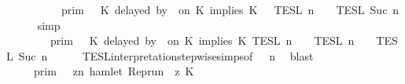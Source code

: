 \begin{isabellebody}
\ \ \ \ \ \ \ \ {\isasymlbrakk}{\isasymlbrakk}\ {\isasymGamma}\ {\isasymrbrakk}{\isasymrbrakk}\isactrlsub p\isactrlsub r\isactrlsub i\isactrlsub m\ {\isasyminter}\ {\isasymlbrakk}{\isasymlbrakk}\ {\isacharparenleft}K\ delayed\ by\ {}\ on\ K\ implies\ K\ {\isacharhash}\ {\isasymPsi}\ {\isasymrbrakk}{\isasymrbrakk}\isactrlsub T\isactrlsub E\isactrlsub S\isactrlsub L\isactrlbsup {\isasymge}\ n\isactrlesup \ {\isasyminter}\ {\isasymlbrakk}{\isasymlbrakk}\ {\isasymPhi}\ {\isasymrbrakk}{\isasymrbrakk}\isactrlsub T\isactrlsub E\isactrlsub S\isactrlsub L\isactrlbsup {\isasymge}\ Suc\ n\isactrlesup {\isacartoucheclose}\isanewline
\ \ \ \ \isamarkupfalse%
\ simp\isanewline
\ \ \isamarkupfalse%
\ \isamarkupfalse%
\ \isanewline
\ \ \ \ {\isacartoucheopen}{\isachardot}{\isachardot}{\isachardot}\ {\isacharequal}\ {\isasymlbrakk}{\isasymlbrakk}\ {\isasymGamma}\ {\isasymrbrakk}{\isasymrbrakk}\isactrlsub p\isactrlsub r\isactrlsub i\isactrlsub m\ {\isasyminter}\ {\isasymlbrakk}\ K\ delayed\ by\ {}\ on\ K\ implies\ K\ {\isasymrbrakk}\isactrlsub T\isactrlsub E\isactrlsub S\isactrlsub L\isactrlbsup {\isasymge}\ n\isactrlesup \ {\isasyminter}\ {\isasymlbrakk}{\isasymlbrakk}\ {\isasymPsi}\ {\isasymrbrakk}{\isasymrbrakk}\isactrlsub T\isactrlsub E\isactrlsub S\isactrlsub L\isactrlbsup {\isasymge}\ n\isactrlesup \ {\isasyminter}\ {\isasymlbrakk}{\isasymlbrakk}\ {\isasymPhi}\ {\isasymrbrakk}{\isasymrbrakk}\isactrlsub T\isactrlsub E\isactrlsub S\isactrlsub L\isactrlbsup {\isasymge}\ Suc\ n\isactrlesup {\isacartoucheclose}\isanewline
\ \ \ \ \isamarkupfalse%
\ TESL{\isacharunderscore}interpretation{\isacharunderscore}stepwise{\isachardot}simps{\isacharparenleft}{}{\isacharparenright}{\isacharbrackleft}of\ {\isacharunderscore}\ {\isacartoucheopen}{\isasymPsi}{\isacartoucheclose}\ {\isacartoucheopen}n{\isacartoucheclose}{\isacharbrackright}\ \isamarkupfalse%
\ blast\isanewline
\ \ \isamarkupfalse%
\ \isamarkupfalse%
\ {\isacartoucheopen}{\isachardot}{\isachardot}{\isachardot}\ {\isacharequal}\ {\isasymlbrakk}{\isasymlbrakk}\ {\isasymGamma}\ {\isasymrbrakk}{\isasymrbrakk}\isactrlsub p\isactrlsub r\isactrlsub i\isactrlsub m\ {\isasyminter}\ {\isacharbraceleft}{\isasymrho}{\isachardot}\ {\isasymforall}z{\isasymge}n{\isachardot}\ hamlet\ {\isacharparenleft}{\isacharparenleft}Rep{\isacharunderscore}run\ {\isasymrho}{\isacharparenright}\ z\ K\ {\isasymlongrightarrow}\isanewline

\end{isabellebody}
